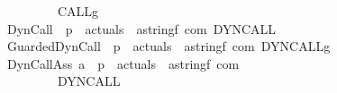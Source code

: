 \begin{isabellebody}
\ \ \ \ \ \ \ \ \ \ \ \ \ {\isacharparenleft}{\isachardoublequoteopen}{\isacharunderscore}\ {\isacharcolon}{\isacharequal}{\isacharequal}\ CALL\isactrlsub g\ {\isacharunderscore}{\isacharunderscore}{\isachardoublequoteclose}\ {\isacharbrackleft}{}{}{\isacharcomma}{}{}{}{}{\isacharcomma}{}{}{}{}{\isacharbrackright}\ {}{}{\isacharparenright}\isanewline
\ \ \ \ \ \ \ {\isachardoublequoteopen}{\isacharunderscore}DynCall{\isachardoublequoteclose}\ {\isacharcolon}{\isacharcolon}\ {\isachardoublequoteopen}{\isacharprime}p\ {\isasymRightarrow}\ actuals\ {\isasymRightarrow}\ {\isacharparenleft}{\isacharparenleft}{\isacharprime}a{\isacharcomma}string{\isacharcomma}{\isacharprime}f{\isacharparenright}\ com{\isacharparenright}{\isachardoublequoteclose}\ {\isacharparenleft}{\isachardoublequoteopen}DYNCALL\ {\isacharunderscore}{\isacharunderscore}{\isachardoublequoteclose}\ {\isacharbrackleft}{}{}{}{}{\isacharcomma}{}{}{}{}{\isacharbrackright}\ {}{}{\isacharparenright}\isanewline
\ \ \ \ \ \ \ {\isachardoublequoteopen}{\isacharunderscore}GuardedDynCall{\isachardoublequoteclose}\ {\isacharcolon}{\isacharcolon}\ {\isachardoublequoteopen}{\isacharprime}p\ {\isasymRightarrow}\ actuals\ {\isasymRightarrow}\ {\isacharparenleft}{\isacharparenleft}{\isacharprime}a{\isacharcomma}string{\isacharcomma}{\isacharprime}f{\isacharparenright}\ com{\isacharparenright}{\isachardoublequoteclose}\ {\isacharparenleft}{\isachardoublequoteopen}DYNCALL\isactrlsub g\ {\isacharunderscore}{\isacharunderscore}{\isachardoublequoteclose}\ {\isacharbrackleft}{}{}{}{}{\isacharcomma}{}{}{}{}{\isacharbrackright}\ {}{}{\isacharparenright}\isanewline
\ \ \ \ \ \ \ {\isachardoublequoteopen}{\isacharunderscore}DynCallAss{\isachardoublequoteclose}{\isacharcolon}{\isacharcolon}\ {\isachardoublequoteopen}{\isacharprime}a\ {\isasymRightarrow}\ {\isacharprime}p\ {\isasymRightarrow}\ actuals\ {\isasymRightarrow}\ {\isacharparenleft}{\isacharparenleft}{\isacharprime}a{\isacharcomma}string{\isacharcomma}{\isacharprime}f{\isacharparenright}\ com{\isacharparenright}{\isachardoublequoteclose}\ \isanewline
\ \ \ \ \ \ \ \ \ \ \ \ \ {\isacharparenleft}{\isachardoublequoteopen}{\isacharunderscore}\ {\isacharcolon}{\isacharequal}{\isacharequal}\ DYNCALL\ {\isacharunderscore}{\isacharunderscore}{\isachardoublequoteclose}\ {\isacharbrackleft}{}{}{\isacharcomma}{}{}{}{}{\isacharcomma}{}{}{}{}{\isacharbrackright}\ {}{}{\isacharparenright}\isanewline

\end{isabellebody}
